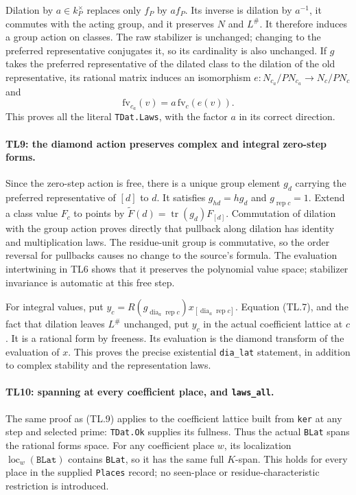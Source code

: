 Dilation by $a\in k_P^\times$ replaces only $f_P$ by $af_P$.
Its inverse is dilation by $a^{-1}$, it commutes with the acting
group, and it preserves $N$ and $L^\#$. It therefore induces a
group action on classes. The raw stabilizer is unchanged; changing
to the preferred representative conjugates it, so its cardinality
is also unchanged. If $g$ takes the preferred representative of the
dilated class to the dilation of the old representative, its
rational matrix induces an isomorphism
$e:N_{c_a}/PN_{c_a}\to N_c/PN_c$ and
\[
 \mathrm{fv}_{c_a}(v)=a\,\mathrm{fv}_c(e(v)).      \tag{TL.13}
\]
This proves all the literal \texttt{TDat.Laws}, with the factor
$a$ in its correct direction.

\paragraph{TL9: the diamond action preserves complex and integral
zero-step forms.}
Since the zero-step action is free, there is a unique group element
$g_d$ carrying the preferred representative of $[d]$ to $d$.
It satisfies $g_{hd}=hg_d$ and $g_{\operatorname{rep}c}=1$.
Extend a class value $F_c$ to points by
$\widetilde F(d)=\operatorname{tr}(g_d)F_{[d]}$.
Commutation of dilation with the group action proves directly that
pullback along dilation has identity and multiplication laws. The
residue-unit group is commutative, so the order reversal for
pullbacks causes no change to the source's formula. The evaluation
intertwining in TL6 shows that it preserves the polynomial value
space; stabilizer invariance is automatic at this free step.

For integral values, put
$y_c=R(g_{\operatorname{dia}_a\operatorname{rep}c})
 x_{[\operatorname{dia}_a\operatorname{rep}c]}$.
Equation (TL.7), and the fact that dilation leaves $L^\#$ unchanged,
put $y_c$ in the actual coefficient lattice at $c$. It is a rational
form by freeness. Its evaluation is the diamond transform of the
evaluation of $x$. This proves the precise existential
\texttt{dia\_lat} statement, in addition to complex stability and
the representation laws.

\paragraph{TL10: spanning at every coefficient place, and
\texttt{laws\_all}.}
The same proof as (TL.9) applies to the coefficient lattice built
from \texttt{ker} at any step and selected prime: \texttt{TDat.Ok}
supplies its fullness. Thus the actual \texttt{BLat} spans the
rational forms space. For any coefficient place $w$, its localization
$\operatorname{loc}_w(\texttt{BLat})$ contains \texttt{BLat}, so it
has the same full $K$-span. This holds for every place in the supplied
\texttt{Places} record; no seen-place or residue-characteristic
restriction is introduced.

